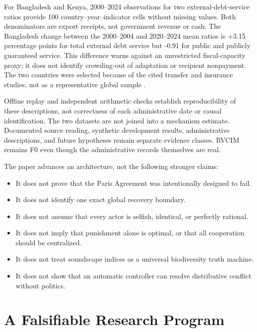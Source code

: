 \documentclass[11pt,a4paper]{article}
\numberwithin{equation}{section}
\theoremstyle{definition}
\theoremstyle{plain}
\theoremstyle{remark}
\begin{document}
For Bangladesh and Kenya, 2000--2024 observations for two external-debt-service ratios provide 100 country--year--indicator cells without missing values. Both denominators are export receipts, not government revenue or cash. The Bangladesh change between the 2000--2004 and 2020--2024 mean ratios is +3.15 percentage points for total external debt service but -0.91 for public and publicly guaranteed service. This difference warns against an unrestricted fiscal-capacity proxy; it does not identify crowding-out of adaptation or recipient nonpayment. The two countries were selected because of the cited transfer and insurance studies, not as a representative global sample \citep{worldbanktotal,worldbankpublic}.

Offline replay and independent arithmetic checks establish reproducibility of these descriptions, not correctness of each administrative date or causal identification. The two datasets are not joined into a mechanism estimate. Documented source reading, synthetic development results, administrative descriptions, and future hypotheses remain separate evidence classes. RVCIM remains F0 even though the administrative records themselves are real.

The paper advances an architecture, not the following stronger claims:
\begin{itemize}
  \item It does not prove that the Paris Agreement was intentionally designed to fail.
  \item It does not identify one exact global recovery boundary.
  \item It does not assume that every actor is selfish, identical, or perfectly rational.
  \item It does not imply that punishment alone is optimal, or that all cooperation should be centralized.
  \item It does not treat soundscape indices as a universal biodiversity truth machine.
  \item It does not show that an automatic controller can resolve distributive conflict without politics.
\end{itemize}

\section{A Falsifiable Research Program}
\end{document}

